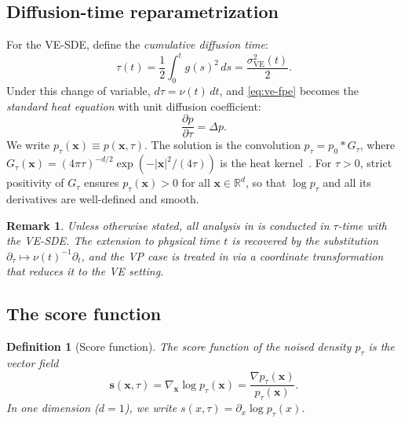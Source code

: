 \documentclass[11pt]{article}
\newtheorem{definition}[theorem]{Definition}
\newtheorem{remark}[theorem]{Remark}
\newcommand{\R}{\mathbb{R}}
\begin{document}
\subsection{Diffusion-time reparametrization}\label{sec:prelim:tau}

For the VE-SDE, define the \emph{cumulative diffusion time}:
\begin{equation}\label{eq:tau-def}
  \tau(t) = \frac{1}{2}\int_0^t g(s)^2\,ds = \frac{\sigma^2_{\mathrm{VE}}(t)}{2}.
\end{equation}
Under this change of variable, $d\tau = \nu(t)\,dt$, and \eqref{eq:ve-fpe} becomes the \emph{standard heat equation} with unit diffusion coefficient:
\begin{equation}\label{eq:heat}
  \frac{\partial p}{\partial \tau} = \Delta p.
\end{equation}
We write $p_\tau(\bm{x}) \equiv p(\bm{x},\tau)$.
The solution is the convolution $p_\tau = p_0 * G_\tau$, where $G_\tau(\bm{x}) = (4\pi\tau)^{-d/2}\exp(-|\bm{x}|^2/(4\tau))$ is the heat kernel~\citep{evans2010partial}.
For $\tau > 0$, strict positivity of $G_\tau$ ensures $p_\tau(\bm{x}) > 0$ for all $\bm{x} \in \R^d$, so that $\log p_\tau$ and all its derivatives are well-defined and smooth.

\begin{remark}\label{rem:tau-convention}
Unless otherwise stated, all analysis in  is conducted in $\tau$-time with the VE-SDE.
The extension to physical time $t$ is recovered by the substitution $\partial_\tau \mapsto \nu(t)^{-1}\partial_t$, and the VP case is treated in  via a coordinate transformation that reduces it to the VE setting.
\end{remark}

\subsection{The score function}\label{sec:prelim:score}

\begin{definition}[Score function]\label{def:score}
The \emph{score function} of the noised density $p_\tau$ is the vector field
\begin{equation}\label{eq:score-def}
  \bm{s}(\bm{x},\tau)
  = \nabla_{\bm{x}} \log p_\tau(\bm{x})
  = \frac{\nabla p_\tau(\bm{x})}{p_\tau(\bm{x})}.
\end{equation}
In one dimension ($d=1$), we write $s(x,\tau) = \partial_x \log p_\tau(x)$.
\end{definition}
\end{document}
